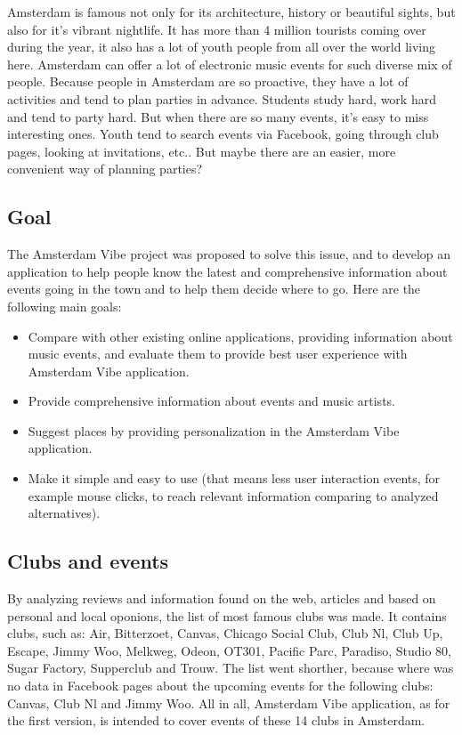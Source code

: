 \documentclass[12pt, a4paper, lithuanian]{article}
\begin{document}
  Amsterdam is famous not only for its architecture, history or beautiful sights, but also for it's vibrant nightlife. It has more than 4 million tourists coming over during the year, it also has a lot of youth people from all over the world living here. Amsterdam can offer a lot of electronic music events for such diverse mix of people. 
  Because people in Amsterdam are so proactive, they have a lot of activities and tend to plan parties in advance. Students study hard, work hard and tend to party hard. But when there are so many events, it's easy to miss interesting ones. Youth tend to search events via Facebook, going through club pages, looking at invitations, etc.. But maybe there are an easier, more convenient way of planning parties? 

\subsection{Goal}

  The Amsterdam Vibe project was proposed to solve this issue, and to develop an application to help people know the latest and comprehensive information about events going in the town and to help them decide where to go.
  Here are the following main goals:

\begin{itemize}

  \item Compare with other existing online applications, providing information about music events, and evaluate them to provide best user experience with Amsterdam Vibe application.

  \item Provide comprehensive information about events and music artists.

  \item Suggest places by providing personalization in the Amsterdam Vibe application.

  \item Make it simple and easy to use (that means less user interaction events, for example mouse clicks, to reach relevant information comparing to analyzed alternatives).

\end{itemize}

\subsection{Clubs and events}

  By analyzing reviews and information found on the web, articles and based on personal and local oponions, the list of most famous clubs was made. It contains clubs, such as: Air, Bitterzoet, Canvas, Chicago Social Club, Club Nl, Club Up, Escape, Jimmy Woo, Melkweg, Odeon, OT301, Pacific Parc, Paradiso, Studio 80, Sugar Factory, Supperclub and Trouw. The list went shorther, because where was no data in Facebook pages about the upcoming events for the following clubs: Canvas, Club Nl and Jimmy Woo. All in all, Amsterdam Vibe application, as for the first version, is intended to cover events of these 14 clubs in Amsterdam.
\end{document}
